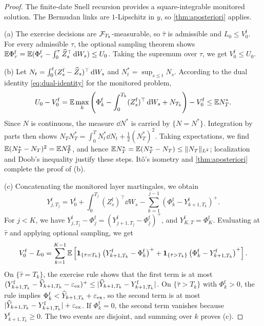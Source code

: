 \begin{proof}

The finite-date Snell recursion provides a square-integrable monitored solution. The Bermudan links are $1$-Lipschitz in $y$, so \cref{thm:aposteriori} applies.

(a) The exercise decisions are $\mathcal{F}_{T_k}$-measurable, so $\hat\tau$ is admissible and $L_0\le V^{\mathrm f}_0$. For every admissible $\tau$, the optional sampling theorem shows $\mathbb{E}\Phi^{\mathrm f}_\tau=\mathbb{E}(\Phi^{\mathrm f}_\tau-\int_0^\tau\widehat Z_s^\top\,\mathrm{d} W_s)\le U_0$. Taking the supremum over $\tau$, we get $V^{\mathrm f}_0\le U_0$.

(b) Let $N_t=\int_0^t(Z^{\mathrm f}_s-\widehat Z_s)^\top\,\mathrm{d} W_s$ and $N^*_t=\sup_{s\le t}N_s$. According to the dual identity \eqref{eq:dual-identity} for the monitored problem,
\[
U_0-V^{\mathrm f}_0=\mathbb{E}\max_k\left(\Phi^{\mathrm f}_k-\int_0^{T_k}(Z^{\mathrm f}_s)^\top\,\mathrm{d} W_s+N_{T_k}\right)-V^{\mathrm f}_0\le\mathbb{E} N^*_T .
\]
Since $N$ is continuous, the measure $\dd N^*$ is carried by $\{N=N^*\}$. Integration by parts then shows $N_TN^*_T=\int_0^TN^*_t\dd N_t+\frac12(N^*_T)^2$. Taking expectations, we find $\mathbb{E}(N^*_T-N_T)^2=\mathbb{E} N_T^2$, and hence $\mathbb{E} N^*_T=\mathbb{E}(N^*_T-N_T)\le\lVert N_T\rVert_{L^2}$; localization and Doob's inequality justify these steps. It\^o's isometry and \cref{thm:aposteriori} complete the proof of (b).

(c) Concatenating the monitored layer martingales, we obtain
\[
Y^{\mathrm f}_{j,T_j}=V^{\mathrm f}_0+\int_0^{T_j}(Z^{\mathrm f}_s)^\top\dd W_s-\sum_{k=1}^{j-1}\left(\Phi^{\mathrm f}_k-Y^{\mathrm f}_{k+1,T_k}\right)^+ .
\]
For $j<K$, we have $Y^{\mathrm f}_{j,T_j}-\Phi^{\mathrm f}_j=(Y^{\mathrm f}_{j+1,T_j}-\Phi^{\mathrm f}_j)^+$, and $Y^{\mathrm f}_{K,T}=\Phi^{\mathrm f}_K$. Evaluating at $\hat\tau$ and applying optional sampling, we get
\[
V^{\mathrm f}_0-L_0=\sum_{k=1}^{K-1}\mathbb{E}\left[\mathbf{1}_{\{\hat\tau=T_k\}}\left(Y^{\mathrm f}_{k+1,T_k}-\Phi^{\mathrm f}_k\right)^++\mathbf{1}_{\{\hat\tau>T_k\}}\left(\Phi^{\mathrm f}_k-Y^{\mathrm f}_{k+1,T_k}\right)^+\right].
\]
On $\{\hat\tau=T_k\}$, the exercise rule shows that the first term is at most $(Y^{\mathrm f}_{k+1,T_k}-\widehat Y_{k+1,T_k}-\varepsilon_{\mathrm{ex}})^+\le\lvert \widehat Y_{k+1,T_k}-Y^{\mathrm f}_{k+1,T_k}\rvert$. On $\{\hat\tau>T_k\}$ with $\Phi^{\mathrm f}_k>0$, the rule implies $\Phi^{\mathrm f}_k<\widehat Y_{k+1,T_k}+\varepsilon_{\mathrm{ex}}$, so the second term is at most $\lvert \widehat Y_{k+1,T_k}-Y^{\mathrm f}_{k+1,T_k}\rvert+\varepsilon_{\mathrm{ex}}$. If $\Phi^{\mathrm f}_k=0$, the second term vanishes because $Y^{\mathrm f}_{k+1,T_k}\ge0$. The two events are disjoint, and summing over $k$ proves (c).


\end{proof}
